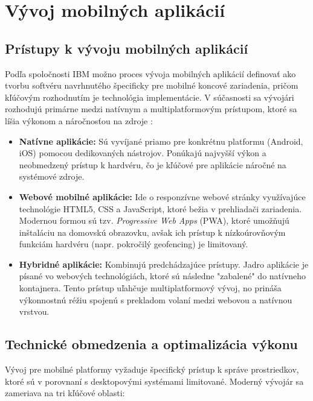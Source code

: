 \section{Vývoj mobilných aplikácií}

\subsection{Prístupy k vývoju mobilných aplikácií}
Podľa spoločnosti IBM možno proces vývoja mobilných aplikácií definovať ako tvorbu softvéru navrhnutého špecificky pre mobilné koncové zariadenia, pričom kľúčovým rozhodnutím je technológia implementácie. V súčasnosti sa vývojári rozhodujú primárne medzi natívnym a multiplatformovým prístupom, ktoré sa líšia výkonom a náročnosťou na zdroje \cite{pullur_medium_2025, olsav2024mobilna}:

\begin{itemize}
    \item \textbf{Natívne aplikácie:} Sú vyvíjané priamo pre konkrétnu platformu (Android, iOS) pomocou dedikovaných nástrojov. Ponúkajú najvyšší výkon a neobmedzený prístup k hardvéru, čo je kľúčové pre aplikácie náročné na systémové zdroje.
    \item \textbf{Webové mobilné aplikácie:} Ide o responzívne webové stránky využívajúce technológie HTML5, CSS a JavaScript, ktoré bežia v prehliadači zariadenia. Modernou formou sú tzv. \textit{Progressive Web Apps} (PWA), ktoré umožňujú inštaláciu na domovskú obrazovku, avšak ich prístup k nízkoúrovňovým funkciám hardvéru (napr. pokročilý geofencing) je limitovaný.
    \item \textbf{Hybridné aplikácie:} Kombinujú predchádzajúce prístupy. Jadro aplikácie je písané vo webových technológiách, ktoré sú následne "zabalené" do natívneho kontajnera. Tento prístup uľahčuje multiplatformový vývoj, no prináša výkonnostnú réžiu spojenú s prekladom volaní medzi webovou a natívnou vrstvou.
\end{itemize}  \cite{olsav2024mobilna} 

\subsection{Technické obmedzenia a optimalizácia výkonu}
Vývoj pre mobilné platformy vyžaduje špecifický prístup k správe prostriedkov, ktoré sú v porovnaní s desktopovými systémami limitované. Moderný vývojár sa zameriava na tri kľúčové oblasti:

